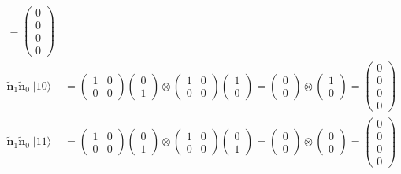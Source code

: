 \documentclass{article}
\begin{document}
\begin{align*}
     = \begin{pmatrix}0\\0\\0\\0\end{pmatrix}\\
\bm{\widetilde{n}}_1\bm{\widetilde{n}}_0 \; |10\rangle
  &= \begin{pmatrix}1 & 0\\0 & 0\end{pmatrix}
     \begin{pmatrix}0\\1\end{pmatrix}
     \otimes
     \begin{pmatrix}1 & 0\\0 & 0\end{pmatrix}
     \begin{pmatrix}1\\0\end{pmatrix}
     = \begin{pmatrix}0\\0\end{pmatrix}
     \otimes
     \begin{pmatrix}1\\0\end{pmatrix}
     = \begin{pmatrix}0\\0\\0\\0\end{pmatrix}\\
\bm{\widetilde{n}}_1\bm{\widetilde{n}}_0 \; |11\rangle
  &= \begin{pmatrix}1 & 0\\0 & 0\end{pmatrix}
     \begin{pmatrix}0\\1\end{pmatrix}
     \otimes
     \begin{pmatrix}1 & 0\\0 & 0\end{pmatrix}
     \begin{pmatrix}0\\1\end{pmatrix}
     = \begin{pmatrix}0\\0\end{pmatrix}
     \otimes
     \begin{pmatrix}0\\0\end{pmatrix}
     = \begin{pmatrix}0\\0\\0\\0\end{pmatrix}
\end{align*}
\end{document}
